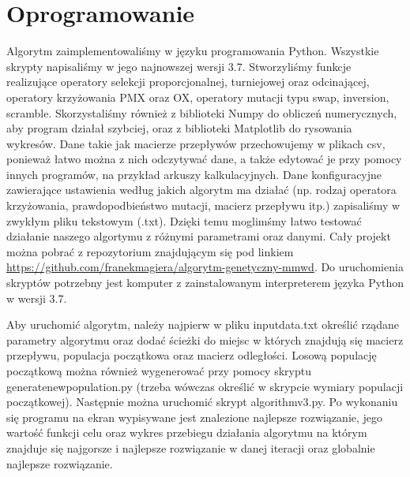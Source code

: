 \documentclass[12pt]{article}
\begin{document}
\section{Oprogramowanie}
Algorytm zaimplementowaliśmy w języku programowania Python. Wszystkie skrypty napisaliśmy w jego najnowszej wersji 3.7. Stworzyliśmy funkcje realizujące operatory selekcji proporcjonalnej, turniejowej oraz odcinającej, operatory krzyżowania PMX oraz OX, operatory mutacji typu swap, inversion, scramble. Skorzystaliśmy również z biblioteki Numpy do obliczeń numerycznych, aby program działał szybciej, oraz z biblioteki Matplotlib do rysowania wykresów. Dane takie jak macierze przepływów przechowujemy w plikach csv, ponieważ łatwo można z nich odczytywać dane, a także edytować je przy pomocy innych programów, na przykład arkuszy kalkulacyjnych. Dane konfiguracyjne zawierające ustawienia według jakich algorytm ma działać (np. rodzaj operatora krzyżowania, prawdopodbieństwo mutacji, macierz przepływu itp.) zapisaliśmy w zwykłym pliku tekstowym (.txt). Dzięki temu moglimśmy łatwo testować działanie naszego algortymu z różnymi parametrami oraz danymi. Cały projekt można pobrać z repozytorium znajdującym się pod linkiem \url{https://github.com/franekmagiera/algorytm-genetyczny-mmwd}. Do uruchomienia skryptów potrzebny jest komputer z zainstalowanym interpreterem języka Python w wersji 3.7. \par
Aby uruchomić algorytm, należy najpierw w pliku input\textunderscore data.txt określić rządane parametry algorytmu oraz dodać ścieżki do miejsc w których znajdują się macierz przepływu, populacja początkowa oraz macierz odległości. Losową populację początkową można również wygenerować przy pomocy skryptu generate\textunderscore new\textunderscore population.py (trzeba wówczas określić w skrypcie wymiary populacji początkowej). Następnie można uruchomić skrypt algorithm\textunderscore v3.py. Po wykonaniu się programu na ekran wypisywane jest znalezione najlepsze rozwiązanie, jego wartość funkcji celu oraz wykres przebiegu działania algorytmu na którym znajduje się najgorsze i najlepsze rozwiązanie w danej iteracji oraz globalnie najlepsze rozwiązanie.
\end{document}
